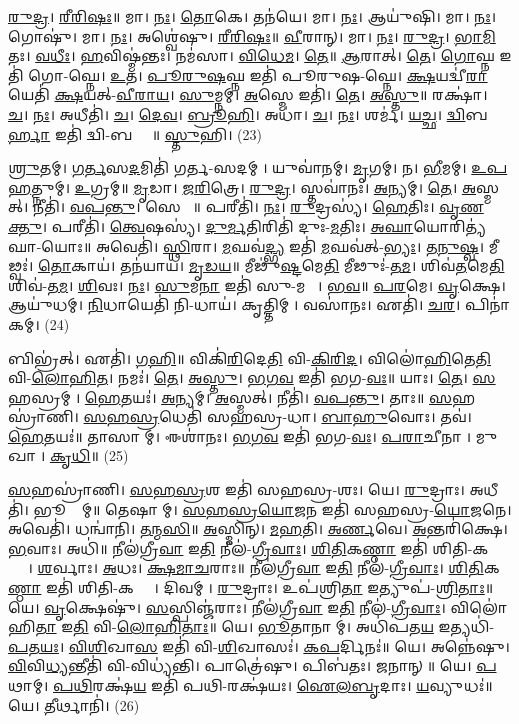 \ul{𑌰𑍁}\ul{𑌦𑍍𑌰}। \ul{𑌰𑍀}\ul{𑌰𑌿}\ul{𑌷𑌃}॥ 
𑌮𑌾। \ul{𑌨𑌃}। \ul{𑌤𑍋}𑌕𑍇। 𑌤𑌨॑𑌯𑍇। 𑌮𑌾। \ul{𑌨𑌃}। 𑌆𑌯𑍁॑𑌷𑌿। 𑌮𑌾। \ul{𑌨𑌃}। 𑌗𑍋𑌷𑍁॑। 𑌮𑌾। \ul{𑌨𑌃}। 𑌅𑌶𑍍𑌵𑍇॑𑌷𑍁। \ul{𑌰𑍀}\ul{𑌰𑌿}\ul{𑌷𑌃}॥ 
\ul{𑌵𑍀}𑌰𑌾𑌨𑍍। 𑌮𑌾। \ul{𑌨𑌃}। \ul{𑌰𑍁}\ul{𑌦𑍍𑌰}। \ul{𑌭𑌾}\ul{𑌮𑌿}𑌤𑌃। \ul{𑌵}\ul{𑌧𑍀𑌃}। \ul{𑌹}𑌵𑌿𑌷𑍍𑌮॑𑌨𑍍𑌤𑌃। 𑌨𑌮॑𑌸𑌾। \ul{𑌵𑌿}\ul{𑌧𑍇}\ul{𑌮}। \ul{𑌤𑍇}॥ 
\ul{𑌆}𑌰𑌾𑌤𑍍। \ul{𑌤𑍇}। \ul{𑌗𑍋}𑌘𑍍𑌨 𑌇𑌤𑌿॑ 𑌗𑍋-𑌘𑍍𑌨𑍇। \ul{𑌉}𑌤। \ul{𑌪𑍂}\ul{𑌰𑍁}\ul{𑌷}𑌘𑍍𑌨 𑌇𑌤𑌿॑ 𑌪𑍂𑌰𑍁𑌷-𑌘𑍍𑌨𑍇। \ul{𑌕𑍍𑌷}𑌯𑌦𑍍𑌵𑍀॑\ul{𑌰𑌾}𑌯𑍇𑌤𑌿॑ \ul{𑌕𑍍𑌷}𑌯𑌤𑍍-\ul{𑌵𑍀}\ul{𑌰𑌾}\ul{𑌯}। \ul{𑌸𑍁}𑌮𑍍𑌨𑌮𑍍। \ul{𑌅}𑌸𑍍𑌮𑍇 𑌇𑌤𑌿॑। \ul{𑌤𑍇}। \ul{𑌅}\ul{𑌸𑍍𑌤𑍁}॥ 
𑌰𑌕𑍍𑌷𑌾॑। \ul{𑌚}। \ul{𑌨𑌃}। 𑌅𑌧𑍀𑌤𑌿॑। \ul{𑌚}। \ul{𑌦𑍇}\ul{𑌵}। \ul{𑌬𑍍𑌰𑍂}\ul{𑌹𑌿}। 𑌅𑌧𑌾॑। \ul{𑌚}। \ul{𑌨𑌃}। 𑌶𑌰𑍍𑌮॑। \ul{𑌯}\ul{𑌚𑍍𑌛}। \ul{𑌦𑍍𑌵𑌿}𑌬\ul{𑌰𑍍𑌹𑌾} 𑌇𑌤𑌿॑ 𑌦𑍍𑌵𑌿-𑌬𑌰𑍍𑌹𑌾𑌃᳚॥ 
\ul{𑌸𑍍𑌤𑍁}𑌹𑌿। (23)


\ul{𑌶𑍍𑌰𑍁}𑌤𑌮𑍍। \ul{𑌗}\ul{𑌰𑍍𑌤}𑌸\ul{𑌦}𑌮𑌿𑌤𑌿॑ 𑌗𑌰𑍍𑌤-𑌸𑌦𑌮𑍍। 𑌯𑍁𑌵𑌾॑𑌨𑌮𑍍। \ul{𑌮𑍃}𑌗𑌮𑍍। 𑌨। \ul{𑌭𑍀}𑌮𑌮𑍍। \ul{𑌉}\ul{𑌪}\ul{𑌹}𑌤𑍍𑌨𑍁𑌮𑍍। \ul{𑌉}𑌗𑍍𑌰𑌮𑍍॥ 
\ul{𑌮𑍃}𑌡𑌾। \ul{𑌜}\ul{𑌰𑌿}𑌤𑍍𑌰𑍇। \ul{𑌰𑍁}\ul{𑌦𑍍𑌰}। 𑌸𑍍𑌤𑌵𑌾॑𑌨𑌃। \ul{𑌅}𑌨𑍍𑌯𑌮𑍍। \ul{𑌤𑍇}। \ul{𑌅}𑌸𑍍𑌮𑌤𑍍। 𑌨𑍀𑌤𑌿॑। \ul{𑌵}\ul{𑌪}\ul{𑌨𑍍𑌤𑍁}। 𑌸𑍇𑌨𑌾𑌃᳚॥ 
𑌪𑌰𑍀𑌤𑌿॑। \ul{𑌨𑌃}। \ul{𑌰𑍁}𑌦𑍍𑌰𑌸𑍍𑌯॑। \ul{𑌹𑍇}𑌤𑌿𑌃। \ul{𑌵𑍃}\ul{𑌣}\ul{𑌕𑍍𑌤𑍁}। 𑌪𑌰𑍀𑌤𑌿॑। \ul{𑌤𑍍𑌵𑍇}𑌷𑌸𑍍𑌯॑। \ul{𑌦𑍁}\ul{𑌰𑍍𑌮}𑌤𑌿𑌰𑌿𑌤𑌿॑ 𑌦𑍁𑌃-\ul{𑌮}𑌤𑌿𑌃। \ul{𑌅}\ul{𑌘𑌾}𑌯𑍋𑌰𑌿𑌤𑍍𑌯॑𑌘𑌾-𑌯𑍋𑌃॥ 
𑌅𑌵𑍇𑌤𑌿॑। \ul{𑌸𑍍𑌥𑌿}𑌰𑌾। \ul{𑌮}𑌘𑌵॑\ul{𑌦𑍍𑌭𑍍𑌯} 𑌇𑌤𑌿॑ \ul{𑌮}𑌘𑌵॑𑌤𑍍-\ul{𑌭𑍍𑌯𑌃}। \ul{𑌤}\ul{𑌨𑍁}\ul{𑌷𑍍𑌵}। 𑌮𑍀𑌢𑍍𑌵𑌃॑। \ul{𑌤𑍋}𑌕𑌾𑌯॑। 𑌤𑌨॑𑌯𑌾𑌯। \ul{𑌮𑍃}\ul{𑌡}\ul{𑌯}॥ 
𑌮𑍀𑌢𑍁॑\ul{𑌷𑍍𑌟}𑌮𑍇\ul{𑌤𑌿} 𑌮𑍀𑌢𑍁𑌃॑-\ul{𑌤}\ul{𑌮}। 𑌶𑌿𑌵॑\ul{𑌤}𑌮𑍇\ul{𑌤𑌿} 𑌶𑌿𑌵॑-\ul{𑌤}\ul{𑌮}। \ul{𑌶𑌿}𑌵𑌃। \ul{𑌨𑌃}। \ul{𑌸𑍁}𑌮\ul{𑌨𑌾} 𑌇𑌤𑌿॑ 𑌸𑍁-𑌮𑌨𑌾𑌃᳚। \ul{𑌭}\ul{𑌵}॥ 
\ul{𑌪}\ul{𑌰}𑌮𑍇। \ul{𑌵𑍃}𑌕𑍍𑌷𑍇। 𑌆𑌯𑍁॑𑌧𑌮𑍍। \ul{𑌨𑌿}𑌧𑌾𑌯𑍇𑌤𑌿॑ 𑌨𑌿-𑌧𑌾𑌯॑। 𑌕𑍃𑌤𑍍𑌤𑌿𑌮𑍍। 𑌵𑌸𑌾॑𑌨𑌃। 𑌏𑌤𑌿॑। \ul{𑌚}\ul{𑌰}। 𑌪𑌿𑌨𑌾॑𑌕𑌮𑍍। (24)


𑌬𑌿𑌭𑍍𑌰॑𑌤𑍍। 𑌏𑌤𑌿॑। \ul{𑌗}\ul{𑌹𑌿}॥ 
𑌵𑌿𑌕𑌿॑\ul{𑌰𑌿}𑌦𑍇\ul{𑌤𑌿} 𑌵𑌿-\ul{𑌕𑌿}\ul{𑌰𑌿}\ul{𑌦}। 𑌵𑌿𑌲𑍋॑\ul{𑌹𑌿}𑌤𑍇\ul{𑌤𑌿} 𑌵𑌿-\ul{𑌲𑍋}\ul{𑌹𑌿}\ul{𑌤}। 𑌨𑌮𑌃॑। \ul{𑌤𑍇}। \ul{𑌅}\ul{𑌸𑍍𑌤𑍁}। \ul{𑌭}\ul{𑌗}\ul{𑌵} 𑌇𑌤𑌿॑ 𑌭𑌗-\ul{𑌵𑌃}॥ 
𑌯𑌾𑌃। \ul{𑌤𑍇}। \ul{𑌸}𑌹𑌸𑍍𑌰𑌮𑍍। \ul{𑌹𑍇}𑌤𑌯𑌃॑। \ul{𑌅}𑌨𑍍𑌯𑌮𑍍। \ul{𑌅}𑌸𑍍𑌮𑌤𑍍। 𑌨𑍀𑌤𑌿॑। \ul{𑌵}\ul{𑌪}\ul{𑌨𑍍𑌤𑍁}। 𑌤𑌾𑌃॥ 
\ul{𑌸}𑌹𑌸𑍍𑌰𑌾॑𑌣𑌿। \ul{𑌸}\ul{𑌹}\ul{𑌸𑍍𑌰}𑌧𑍇𑌤𑌿॑ 𑌸𑌹𑌸𑍍𑌰-𑌧𑌾। \ul{𑌬𑌾}\ul{𑌹𑍁}𑌵𑍋𑌃। 𑌤𑌵॑। \ul{𑌹𑍇}𑌤𑌯𑌃॑॥ 
𑌤𑌾𑌸𑌾𑌮𑍍। 𑌈𑌶𑌾॑𑌨𑌃। \ul{𑌭}\ul{𑌗}\ul{𑌵} 𑌇𑌤𑌿॑ 𑌭𑌗-\ul{𑌵𑌃}। \ul{𑌪}\ul{𑌰𑌾}𑌚𑍀𑌨𑌾। 𑌮𑍁𑌖𑌾। \ul{𑌕𑍃}\ul{𑌧𑌿}॥ (25)


\ul{𑌸}𑌹𑌸𑍍𑌰𑌾॑𑌣𑌿। \ul{𑌸}\ul{𑌹}\ul{𑌸𑍍𑌰}𑌶 𑌇𑌤𑌿॑ 𑌸𑌹𑌸𑍍𑌰-𑌶𑌃। 𑌯𑍇। \ul{𑌰𑍁}𑌦𑍍𑌰𑌾𑌃। 𑌅𑌧𑍀𑌤𑌿॑। 𑌭𑍂𑌮𑍍𑌯𑌾᳚𑌮𑍍॥ 
𑌤𑍇𑌷𑌾𑌮𑍍। \ul{𑌸}\ul{𑌹}\ul{𑌸𑍍𑌰}\ul{𑌯𑍋}\ul{𑌜}𑌨 𑌇𑌤𑌿॑ 𑌸𑌹𑌸𑍍𑌰-\ul{𑌯𑍋}\ul{𑌜}𑌨𑍇। 𑌅𑌵𑍇𑌤𑌿॑। 𑌧𑌨𑍍𑌵𑌾॑𑌨𑌿। \ul{𑌤}\ul{𑌨𑍍𑌮}\ul{𑌸𑌿}॥ 
\ul{𑌅}𑌸𑍍𑌮𑌿𑌨𑍍। \ul{𑌮}\ul{𑌹}𑌤𑌿। \ul{𑌅}\ul{𑌰𑍍𑌣}𑌵𑍇। \ul{𑌅}𑌨𑍍𑌤𑌰𑌿॑𑌕𑍍𑌷𑍇। \ul{𑌭}𑌵𑌾𑌃। 𑌅𑌧𑌿॑॥ 
𑌨𑍀𑌲॑𑌗𑍍𑌰𑍀\ul{𑌵𑌾} 𑌇\ul{𑌤𑌿} 𑌨𑍀𑌲॑-\ul{𑌗𑍍𑌰𑍀}\ul{𑌵𑌾𑌃}। \ul{𑌶𑌿}\ul{𑌤𑌿}𑌕\ul{𑌣𑍍𑌠𑌾} 𑌇𑌤𑌿॑ 𑌶𑌿𑌤𑌿-𑌕𑌣𑍍𑌠𑌾𑌃᳚। \ul{𑌶}𑌰𑍍𑌵𑌾𑌃। \ul{𑌅}𑌧𑌃। \ul{𑌕𑍍𑌷}\ul{𑌮𑌾}\ul{𑌚}𑌰𑌾𑌃॥ 
𑌨𑍀𑌲॑𑌗𑍍𑌰𑍀\ul{𑌵𑌾} 𑌇\ul{𑌤𑌿} 𑌨𑍀𑌲॑-\ul{𑌗𑍍𑌰𑍀}\ul{𑌵𑌾𑌃}। \ul{𑌶𑌿}\ul{𑌤𑌿}𑌕\ul{𑌣𑍍𑌠𑌾} 𑌇𑌤𑌿॑ 𑌶𑌿𑌤𑌿-𑌕𑌣𑍍𑌠𑌾𑌃᳚। 𑌦𑌿𑌵𑌮𑍍। \ul{𑌰𑍁}𑌦𑍍𑌰𑌾𑌃। 𑌉𑌪॑𑌶𑍍𑌰𑌿\ul{𑌤𑌾} 𑌇𑌤𑍍𑌯𑍁𑌪॑-\ul{𑌶𑍍𑌰𑌿}\ul{𑌤𑌾𑌃}॥ 
𑌯𑍇। \ul{𑌵𑍃}𑌕𑍍𑌷𑍇𑌷𑍁॑। \ul{𑌸}𑌸𑍍𑌪𑌿𑌞𑍍𑌜॑𑌰𑌾𑌃। 𑌨𑍀𑌲॑𑌗𑍍𑌰𑍀\ul{𑌵𑌾} 𑌇\ul{𑌤𑌿} 𑌨𑍀𑌲॑-\ul{𑌗𑍍𑌰𑍀}\ul{𑌵𑌾𑌃}। 𑌵𑌿𑌲𑍋॑𑌹𑌿\ul{𑌤𑌾} 𑌇\ul{𑌤𑌿} 𑌵𑌿-\ul{𑌲𑍋}\ul{𑌹𑌿}\ul{𑌤𑌾𑌃}॥ 
𑌯𑍇। \ul{𑌭𑍂}𑌤𑌾𑌨𑌾𑌮𑍍। 𑌅𑌧𑌿॑𑌪𑌤\ul{𑌯} 𑌇𑌤𑍍𑌯𑌧𑌿॑-\ul{𑌪}\ul{𑌤}\ul{𑌯𑌃}। \ul{𑌵𑌿}\ul{𑌶𑌿}𑌖𑌾\ul{𑌸} 𑌇𑌤𑌿॑ 𑌵𑌿-\ul{𑌶𑌿}𑌖𑌾𑌸𑌃॑। \ul{𑌕}\ul{𑌪}𑌰𑍍𑌦𑌿𑌨𑌃॑॥ 
𑌯𑍇। 𑌅𑌨𑍍𑌨𑍇॑𑌷𑍁। \ul{𑌵𑌿}𑌵𑌿\ul{𑌧𑍍𑌯}𑌨𑍍𑌤𑍀𑌤𑌿॑ 𑌵𑌿-𑌵𑌿𑌧𑍍𑌯॑𑌨𑍍𑌤𑌿। 𑌪𑌾𑌤𑍍𑌰𑍇॑𑌷𑍁। 𑌪𑌿𑌬॑𑌤𑌃। 𑌜𑌨𑌾𑌨𑍍॥ 
𑌯𑍇। \ul{𑌪}𑌥𑌾𑌮𑍍। \ul{𑌪}\ul{𑌥𑌿}𑌰𑌕𑍍𑌷॑\ul{𑌯} 𑌇𑌤𑌿॑ 𑌪𑌥𑌿-𑌰𑌕𑍍𑌷॑𑌯𑌃। \ul{𑌐}\ul{𑌲}\ul{𑌬𑍃}𑌦𑌾𑌃। \ul{𑌯}𑌵𑍍𑌯𑍁𑌧𑌃॑॥ 
𑌯𑍇। \ul{𑌤𑍀}𑌰𑍍𑌥𑌾𑌨𑌿॑। (26)


